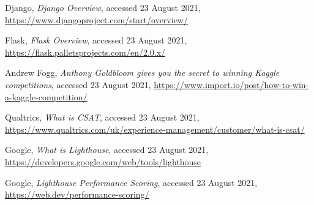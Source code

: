 \documentclass[]{UCD_CS_47360_Report}
\begin{document}
\begin{thebibliography}{99}
 Django, \emph{Django Overview}, accessed 23 August 2021, \href{https://www.djangoproject.com/start/overview/}{https://www.djangoproject.com/start/overview/}

 Flask, \emph{Flask Overview}, accessed 23 August 2021, \href{
https://flask.palletsprojects.com/en/2.0.x/}{https://flask.palletsprojects.com/en/2.0.x/}

 Andrew Fogg, \emph{Anthony Goldbloom gives you the secret to winning Kaggle competitions}, accessed 23 August 2021, \href{https://www.import.io/post/how-to-win-a-kaggle-competition/}{https://www.import.io/post/how-to-win-a-kaggle-competition/}

 Qualtrics, \emph{What is CSAT}, accessed 23 August 2021, \href{https://www.qualtrics.com/uk/experience-management/customer/what-is-csat/}{https://www.qualtrics.com/uk/experience-management/customer/what-is-csat/}

 Google, \emph{What is Lighthouse}, accessed 23 August 2021, \href{https://developers.google.com/web/tools/lighthouse}{https://developers.google.com/web/tools/lighthouse}

 Google, \emph{Lighthouse Performance Scoring}, accessed 23 August 2021, \href{https://web.dev/performance-scoring/}{https://web.dev/performance-scoring/}

\end{thebibliography}
\label{endpage}
\end{document}
